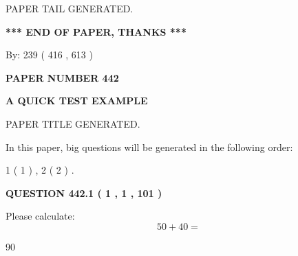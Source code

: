 \documentclass[12pt]{article}
\begin{document}
   
   
   
   
   
 \vspace{0.2in}
 
   
   
\vspace{2.0in} PAPER TAIL GENERATED.
   
   
   
   
\vspace{1.0in} 
{\textbf{\large{ *** END OF PAPER, THANKS *** }}} 
   
   
\hspace{1.0in} By: 
 239 ( 416 ,  613 )
   
   
   
   
\newpage 
\setcounter{page}{ 
   442001 } 
   
   
   
   
 {\textbf{ \Large{ PAPER NUMBER  442  }}}
   
   
\vspace{0.2in}
   
   
   
   
   
   
   
   
 \vspace{0.2in}
{\LARGE {\textbf{ A QUICK TEST EXAMPLE}}}
   
   
 PAPER TITLE GENERATED.
   
   
   
\vspace{0.2in}
   
In this paper, big questions will be generated in the following order: 
   
   
   1 ( 1 )
 ,
   2 ( 2 )
 .
  
\vspace{0.2in}
  
{\textbf{\Large{QUESTION
442.1 
 ( 1 , 1 , 101 )
}}}
  
  
 
Please calculate:
\begin{equation}
50 +  %
40 = \nonumber
\end{equation}
 
 
 
\noindent{}
 
 

90
 
\end{document}
